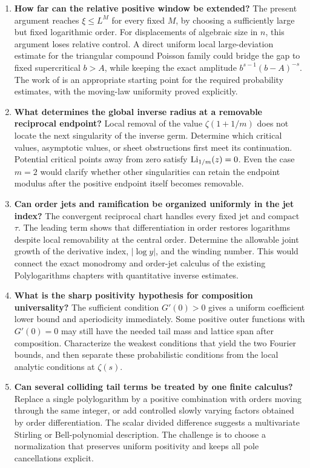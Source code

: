 \begin{enumerate}[label=\textbf{R\arabic*.},leftmargin=*]
\item \textbf{How far can the relative positive window be
extended?} The present argument reaches $\xi\le L^M$ for
every fixed $M$, by choosing a sufficiently large but fixed
logarithmic order. For displacements of algebraic size in
$n$, this argument loses relative control. A direct uniform
local large-deviation estimate for the triangular compound
Poisson family could bridge the gap to fixed supercritical
$b>A$, while keeping the exact amplitude
$b^{s-1}(b-A)^{-s}$. The work of \cite{berger} is an
appropriate starting point for the required probability
estimates, with the moving-law uniformity proved explicitly.

\item \textbf{What determines the global inverse radius at a
removable reciprocal endpoint?} Local removal of the value
$\zeta(1+1/m)$ does not locate the next singularity of the
inverse germ. Determine which critical values, asymptotic
values, or sheet obstructions first meet its continuation.
Potential critical points away from zero satisfy
$\operatorname{Li}_{1/m}(z)=0$. Even the case $m=2$ would clarify whether
other singularities can retain the endpoint modulus after
the positive endpoint itself becomes removable.

\item \textbf{Can order jets and ramification be organized
uniformly in the jet index?} The convergent reciprocal chart
handles every fixed jet and compact $\tau$.
The leading term shows that differentiation in order restores
logarithms despite local removability at the central order.
Determine the allowable joint growth of the derivative
index, $|\log y|$, and the winding number. This would connect
the exact monodromy and order-jet calculus of the existing
Polylogarithms chapters with quantitative inverse estimates.

\item \textbf{What is the sharp positivity hypothesis for
composition universality?} The sufficient condition
$G'(0)>0$ gives a uniform coefficient lower bound and
aperiodicity immediately. Some positive outer functions
with $G'(0)=0$ may still have the needed tail mass and
lattice span after composition. Characterize the weakest
conditions that yield the two Fourier bounds, and then
separate these probabilistic conditions from the local
analytic conditions at $\zeta(s)$.

\item \textbf{Can several colliding tail terms be treated by
one finite calculus?} Replace a single polylogarithm by a
positive combination with orders moving through the same
integer, or add controlled slowly varying factors obtained
by order differentiation. The scalar divided difference
suggests a multivariate Stirling or Bell-polynomial
description. The challenge is to choose a normalization
that preserves uniform positivity and keeps all pole
cancellations explicit.


\end{enumerate}
